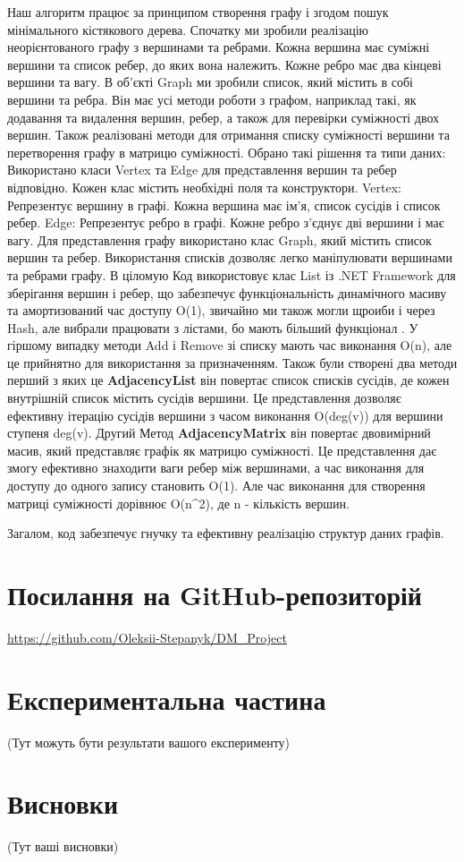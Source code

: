 \documentclass[12pt, letterpaper, twoside]{article}
\begin{document}
Наш алгоритм працює за принципом створення 
графу і згодом пошук мінімального кістякового дерева.
Спочатку ми зробили реалізацію неорієнтованого графу з вершинами та ребрами. Кожна вершина має суміжні вершини та список ребер, до яких вона належить. Кожне ребро має два кінцеві вершини та вагу. В об’єкті Graph ми зробили список, який містить в собі вершини та ребра. Він має усі методи роботи з графом, наприклад такі, як додавання та видалення вершин, ребер, а також для перевірки суміжності двох вершин. Також реалізовані методи для отримання списку суміжності вершини та перетворення графу в матрицю суміжності. 
Обрано такі рішення та типи даних:
Використано класи Vertex та Edge для представлення вершин та ребер відповідно. Кожен клас містить необхідні поля та конструктори.
Vertex: Репрезентує вершину в графі. Кожна вершина має ім'я, список сусідів і список ребер.
Edge: Репрезентує ребро в графі. Кожне ребро з'єднує дві вершини і має вагу.
Для представлення графу використано клас Graph, який містить список вершин та ребер. Використання списків дозволяє легко маніпулювати вершинами та ребрами графу.
В ціломую Код використовує клас List із .NET Framework для зберігання вершин і ребер, що забезпечує функціональність динамічного масиву та амортизований час доступу O(1), звичайно ми також могли щроиби і через Hash, але вибрали працювати з лістами, бо мають більший функціонал . У гіршому випадку методи Add і Remove зі списку мають час виконання O(n), але це прийнятно для використання за призначенням.
Також були створені два методи перший з яких це \textbf {AdjacencyList} він повертає список списків сусідів, де кожен внутрішній список містить сусідів вершини. Це представлення дозволяє ефективну ітерацію сусідів вершини з часом виконання O(deg(v)) для вершини ступеня deg(v).
Другий Метод \textbf{AdjacencyMatrix} він повертає двовимірний масив, який представляє графік як матрицю суміжності. Це представлення дає змогу ефективно знаходити ваги ребер між вершинами, а час виконання для доступу до одного запису становить O(1). Але час виконання для створення матриці суміжності дорівнює O(n^{2}), де n - кількість вершин.

Загалом, код забезпечує гнучку та ефективну реалізацію структур даних графів.



\section{Посилання на GitHub-репозиторій}
\url{https://github.com/Oleksii-Stepanyk/DM_Project}

\section{Експериментальна частина}

(Тут можуть бути результати вашого експерименту)

\section{Висновки}

(Тут ваші висновки)
\end{document}
